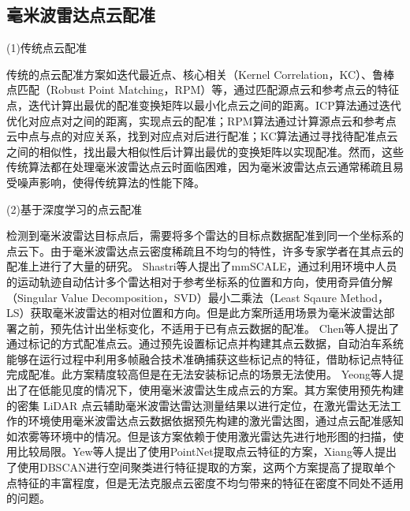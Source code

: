 \subsection{毫米波雷达点云配准}

\par
(1)传统点云配准
\par
传统的点云配准方案如迭代最近点、核心相关（Kernel Correlation，KC）\cite{DBLP:journals/cad/SongHDLY22}、鲁棒点匹配（Robust Point Matching，RPM）\cite{ma2014robust}等，通过匹配源点云和参考点云的特征点，迭代计算出最优的配准变换矩阵以最小化点云之间的距离。ICP算法通过迭代优化对应点对之间的距离，实现点云的配准；RPM算法通过计算源点云和参考点云中点与点的对应关系，找到对应点对后进行配准；KC算法通过寻找待配准点云之间的相似性，找出最大相似性后计算出最优的变换矩阵以实现配准。然而，这些传统算法都在处理毫米波雷达点云时面临困难，因为毫米波雷达点云通常稀疏且易受噪声影响，使得传统算法的性能下降。

\par
(2)基于深度学习的点云配准
\par
检测到毫米波雷达目标点后，需要将多个雷达的目标点数据配准到同一个坐标系的点云下。由于毫米波雷达点云密度稀疏且不均匀的特性，许多专家学者在其点云的配准上进行了大量的研究。
Shastri等人提出了mmSCALE\cite{mmSCALE}，通过利用环境中人员的运动轨迹自动估计多个雷达相对于参考坐标系的位置和方向，使用奇异值分解（Singular Value Decomposition，SVD）最小二乘法（Least Sqaure Method，LS）获取毫米波雷达的相对位置和方向。但是此方案所适用场景为毫米波雷达部署之前，预先估计出坐标变化，不适用于已有点云数据的配准。
Chen等人\cite{9827800}提出了通过标记的方式配准点云。通过预先设置标记点并构建其点云数据，自动泊车系统能够在运行过程中利用多帧融合技术准确捕获这些标记点的特征，借助标记点特征完成配准。此方案精度较高但是在无法安装标记点的场景无法使用。
Yeong等人提出了在低能见度的情况下，使用毫米波雷达生成点云的方案\cite{8967633}。其方案使用预先构建的密集 LiDAR 点云辅助毫米波雷达雷达测量结果以进行定位，在激光雷达无法工作的环境使用毫米波雷达点云数据依据预先构建的激光雷达图，通过点云配准感知如浓雾等环境中的情况。但是该方案依赖于使用激光雷达先进行地形图的扫描，使用比较局限。Yew等人提出了使用PointNet\cite{qi2017pointnet}提取点云特征的方案\cite{Yew_2020_CVPR}，Xiang等人提出了使用DBSCAN\cite{DBLP:conf/kdd/EsterKSX96}进行空间聚类进行特征提取的方案\cite{DBLP:journals/iotj/XiangMTYWGCKY24}，这两个方案提高了提取单个点特征的丰富程度，但是无法克服点云密度不均匀带来的特征在密度不同处不适用的问题。
